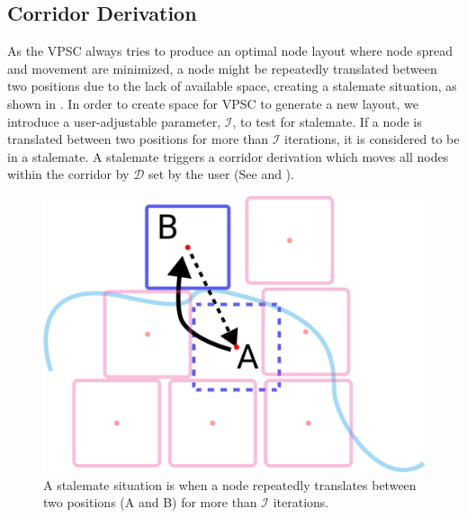 \subsection{Corridor Derivation}

As the VPSC always tries to produce an optimal node layout where node spread and movement are minimized, a node might be repeatedly translated between two positions due to the lack of available space, creating a stalemate situation, as shown in . In order to create space for VPSC to generate a new layout, we introduce a user-adjustable parameter, $ \mathcal{I} $, to test for stalemate. If a node is translated between two positions for more than $ \mathcal{I} $ iterations, it is considered to be in a stalemate. A stalemate triggers a corridor derivation which moves all nodes within the corridor by $ \mathcal{D} $ set by the user (See  and ).

{
\begin{figure}[tb!]
    \centering
    \includegraphics[width=\columnwidth]{figure/stalemate.png}
    \caption{A stalemate situation is when a node repeatedly translates between two positions (A and B) for more than $\mathcal{I}$ iterations. }
    \label{fig:stalemate}
\end{figure}
}

